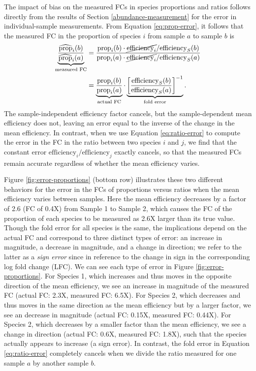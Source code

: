 \documentclass[
]{article}
\begin{document}
The impact of bias on the measured FCs in species proportions and ratios follows directly from the results of Section \ref{abundance-measurement} for the error in individual-sample measurements.
From Equation \eqref{eq:prop-error}, it follows that the measured FC in the proportion of species \(i\) from sample \(a\) to sample \(b\) is
\begin{align}
  \label{eq:prop-fc-error}
\underbrace{\frac{\widehat{\text{prop}}_{i}(b)}{\widehat{\text{prop}}_{i}(a)}} _\text{measured FC}
  &= \frac
    {\text{prop}_{i}(b) \cdot \cancel{\text{efficiency}_{i}} / {\text{efficiency}_S(b)}}
    {\text{prop}_{i}(a) \cdot \cancel{\text{efficiency}_{i}} / {\text{efficiency}_S(a)}}
\\[0.5ex]
  &=
  \underbrace{\frac{\text{prop}_{i}(b)}{\text{prop}_{i}(a)}}_\text{actual FC}
  \cdot
  \underbrace{\left[\frac{\text{efficiency}_S(b)}{\text{efficiency}_S(a)}\right]^{-1}}_\text{fold error}
  .
\end{align}
The sample-independent efficiency factor cancels, but the sample-dependent mean efficiency does not, leaving an error equal to the inverse of the change in the mean efficiency.
In contrast, when we use Equation \eqref{eq:ratio-error} to compute the error in the FC in the ratio between two species \(i\) and \(j\), we find that the constant error \(\text{efficiency}_{i} / \text{efficiency}_{j}\) exactly cancels, so that the measured FCs remain accurate regardless of whether the mean efficiency varies.

Figure \ref{fig:error-proportions} (bottom row) illustrates these two different behaviors for the error in the FCs of proportions versus ratios when the mean efficiency varies between samples.
Here the mean efficiency decreases by a factor of 2.6 (FC of 0.4X) from Sample 1 to Sample 2, which causes the FC of the proportion of each species to be measured as 2.6X larger than its true value.
Though the fold error for all species is the same, the implications depend on the actual FC and correspond to three distinct types of error: an increase in magnitude, a decrease in magnitude, and a change in direction; we refer to the latter as a \emph{sign error} since in reference to the change in sign in the corresponding log fold change (LFC).
We can see each type of error in Figure \ref{fig:error-proportions}.
For Species 1, which increases and thus moves in the opposite direction of the mean efficiency, we see an increase in magnitude of the measured FC (actual FC: 2.3X, measured FC: 6.5X).
For Species 2, which decreases and thus moves in the same direction as the mean efficiency but by a larger factor, we see an decrease in magnitude (actual FC: 0.15X, measured FC: 0.44X).
For Species 2, which decreases by a smaller factor than the mean efficiency, we see a change in direction (actual FC: 0.6X, measured FC: 1.8X), such that the species actually appears to increase (a sign error).
In contrast, the fold error in Equation \eqref{eq:ratio-error} completely cancels when we divide the ratio measured for one sample \(a\) by another sample \(b\).
\end{document}
